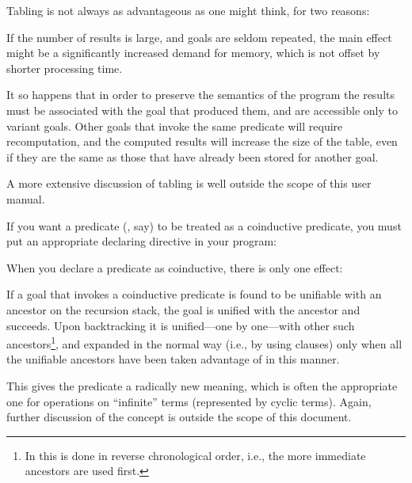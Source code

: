 Tabling is not always as advantageous as one might think, for two reasons:
  \begin{Enumerate}
  \item
    If the number of results is large, and goals are seldom repeated, the
    main effect might be a significantly increased demand for memory, which
    is not offset by shorter processing time.

  \item It so happens that in order to preserve the semantics of the program
    the results must be associated with the goal that produced them, and are
    accessible only to variant goals.  Other goals that invoke the same
    predicate will require recomputation, and the computed results will
    increase the size of the table, even if they are the same as those that
    have already been stored for another goal.
  \end{Enumerate}


A more extensive discussion of tabling is well outside the scope of this user
manual.



%
%

If you want a predicate (, say) to be treated as a coinductive
predicate, you must put an appropriate declaring directive in your
program:\\
\ind{}\label{dir:coinductive}

When you declare a predicate as coinductive, there is only one effect:
\begin{Itemize}
  \item
    If a goal that invokes a coinductive predicate is found to be unifiable
    with an ancestor on the recursion stack, the goal is unified with the
    ancestor and succeeds.  Upon backtracking it is unified---one by
    one---with other such ancestors\footnote{
      In  this is done in reverse chronological order, i.e.,
      the more immediate ancestors are used first.
    }, and expanded in the normal way (i.e., by
    using clauses) only when all the unifiable ancestors have been taken
    advantage of in this manner.
\end{Itemize}
This gives the predicate a radically new meaning, which is often the
appropriate one for operations on ``infinite'' terms (represented by cyclic
terms).  Again, further discussion of the concept is outside the scope of
this document.
